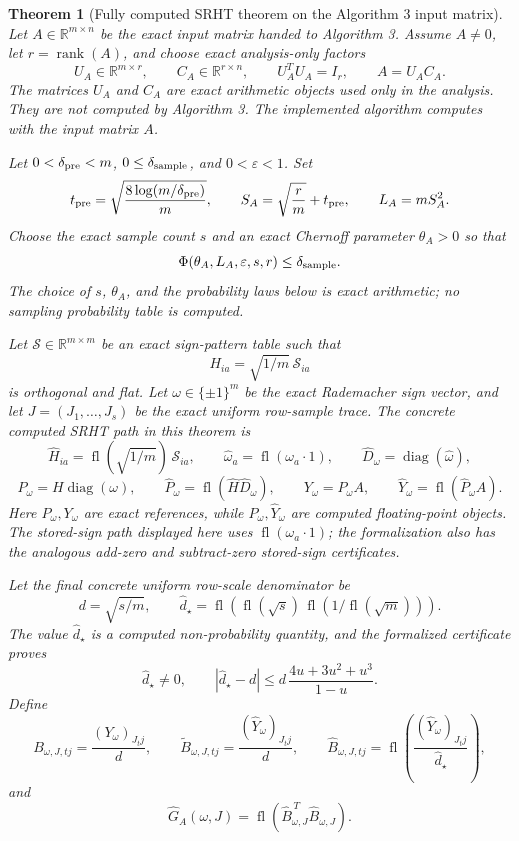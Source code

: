 \documentclass[11pt]{article}
\newcommand{\R}{\mathbb{R}}
\newcommand{\fl}{\operatorname{fl}}
\newcommand{\I}{I}
\newcommand{\eps}{\varepsilon}
\newcommand{\diag}{\operatorname{diag}}
\newtheorem{theorem}{Theorem}
\theoremstyle{remark}
\begin{document}
\begin{theorem}[Fully computed SRHT theorem on the Algorithm 3 input matrix]
Let \(A\in\R^{m\times n}\) be the exact input matrix handed to Algorithm 3.
Assume \(A\ne0\), let \(r=\operatorname{rank}(A)\), and choose exact
analysis-only factors
\[
  U_A\in\R^{m\times r},
  \qquad
  C_A\in\R^{r\times n},
  \qquad
  U_A^TU_A=\I_r,
  \qquad
  A=U_AC_A .
\]
The matrices \(U_A\) and \(C_A\) are exact arithmetic objects used only in the
analysis.  They are not computed by Algorithm 3.  The implemented algorithm
computes with the input matrix \(A\).

Let \(0<\delta_{\rm pre}<m\), \(0\le\delta_{\rm sample}\), and
\(0<\eps<1\).  Set
\[
  t_{\rm pre}=\sqrt{\frac{8\log(m/\delta_{\rm pre})}{m}},
  \qquad
  S_A=\sqrt{\frac rm}+t_{\rm pre},
  \qquad
  L_A=mS_A^2 .
\]
Choose the exact sample count \(s\) and an exact Chernoff parameter
\(\theta_A>0\) so that
\[
  \Phi(\theta_A,L_A,\eps,s,r)\le\delta_{\rm sample}.
\]
The choice of \(s\), \(\theta_A\), and the probability laws below is exact
arithmetic; no sampling probability table is computed.

Let \(\mathcal S\in\R^{m\times m}\) be an exact sign-pattern table such that
\[
  H_{ia}=\sqrt{1/m}\,\mathcal S_{ia}
\]
is orthogonal and flat.  Let \(\omega\in\{\pm1\}^m\) be the exact Rademacher
sign vector, and let \(J=(J_1,\ldots,J_s)\) be the exact uniform row-sample
trace.  The concrete computed SRHT path in this theorem is
\[
  \widehat H_{ia}=\fl(\sqrt{1/m})\,\mathcal S_{ia},
  \qquad
  \widehat\omega_a=\fl(\omega_a\cdot1),
  \qquad
  \widehat D_\omega=\diag(\widehat\omega),
\]
\[
  P_\omega=H\diag(\omega),
  \qquad
  \widehat P_\omega=\fl(\widehat H\widehat D_\omega),
  \qquad
  Y_\omega=P_\omega A,
  \qquad
  \widehat Y_\omega=\fl(\widehat P_\omega A).
\]
Here \(P_\omega,Y_\omega\) are exact references, while
\(\widehat P_\omega,\widehat Y_\omega\) are computed floating-point objects.
The stored-sign path displayed here uses \(\fl(\omega_a\cdot1)\); the
formalization also has the analogous add-zero and subtract-zero stored-sign
certificates.

Let the final concrete uniform row-scale denominator be
\[
  d=\sqrt{s/m},
  \qquad
  \widehat d_\star
  =
  \fl\!\left(
    \fl(\sqrt{s})\,\fl(1/\fl(\sqrt m))
  \right).
\]
The value \(\widehat d_\star\) is a computed non-probability quantity, and the
formalized certificate proves
\[
  \widehat d_\star\ne0,
  \qquad
  |\widehat d_\star-d|
  \le
  d\,\frac{4u+3u^2+u^3}{1-u}.
\]
Define
\[
  B_{\omega,J,tj}=\frac{(Y_\omega)_{J_tj}}{d},
  \qquad
  \widetilde B_{\omega,J,tj}=
    \frac{(\widehat Y_\omega)_{J_tj}}{d},
  \qquad
  \widehat B_{\omega,J,tj}=
    \fl\!\left(\frac{(\widehat Y_\omega)_{J_tj}}{\widehat d_\star}\right),
\]
and
\[
  \widehat G_A(\omega,J)
  =
  \fl\!\left(\widehat B_{\omega,J}^{\,T}\widehat B_{\omega,J}\right).
\]


\end{theorem}
\end{document}
